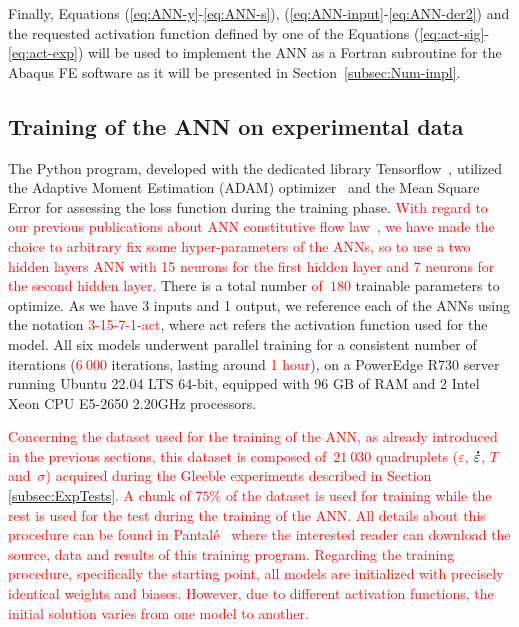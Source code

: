 \documentclass[algorithms,article,submit,pdftex,oneauthors]{Definitions/mdpi}
\DeclareRobustCommand{\mdot}[1]{\accentset{\mbox{\bfseries .}}{#1}}
\begin{document}
Finally, Equations (\ref{eq:ANN-y}-\ref{eq:ANN-s}), (\ref{eq:ANN-input}-\ref{eq:ANN-der2}) and the requested activation function defined by one of the Equations (\ref{eq:act-sig}-\ref{eq:act-exp}) will be used to implement the ANN as a Fortran subroutine for the Abaqus FE software as it will be presented in Section~\ref{subsec:Num-impl}.

\subsection{Training of the ANN on experimental data}\label{subsec:train}

\textcolor{greencolor}{The Python program, developed with the dedicated library Tensorflow~\cite{Tensorflow-2015}, utilized the Adaptive Moment Estimation (ADAM) optimizer~\cite{Kingma-2015-AMS} and the Mean Square Error for assessing the loss function during the training phase.}
\textcolor{red}{With regard to our previous publications about ANN constitutive flow law~\cite{Pantale-2021-EIN}, we have made the choice to arbitrary fix some hyper-parameters of the ANNs, so to use a two hidden layers ANN with 15 neurons for the first hidden layer and 7 neurons for the second hidden layer.}
There is a total number \textcolor{red}{of~$180$} trainable parameters to optimize.
As we have 3 inputs and 1 output, we reference each of the ANNs using the notation \textcolor{red}{3-15-7-1-act}, where act refers the activation function used for the model.
All six models underwent parallel training for a consistent number of iterations (\textcolor{red}{$6~000$} iterations, lasting around \textcolor{red}{1 hour}), on a PowerEdge R730 server running Ubuntu 22.04 LTS 64-bit, equipped with 96 GB of RAM and 2 Intel Xeon CPU E5-2650 2.20GHz processors.

\textcolor{red}{Concerning the dataset used for the training of the ANN, as already introduced in the previous sections, this dataset is composed of~$21~030$ quadruplets ($\varepsilon$, $\mdot{\varepsilon}$, $T$ and~$\sigma$) acquired during the Gleeble experiments described in Section \ref{subsec:ExpTests}.
A chunk of $75\%$ of the dataset is used for training while the rest is used for the test during the training of the ANN.
All details about this procedure can be found in Pantalé~\cite{Pantale-2023-SSF} where the interested reader can download the source, data and results of this training program.}
\textcolor{red}{Regarding the training procedure, specifically the starting point, all models are initialized with precisely identical weights and biases.
However, due to different activation functions, the initial solution varies from one model to another.}
\end{document}
